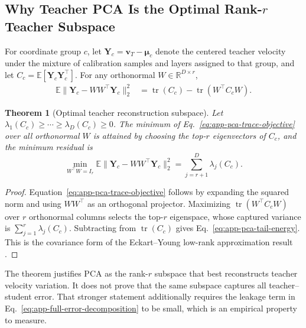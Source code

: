 \documentclass{article}
\newcommand{\E}{\mathbb{E}}
\newcommand{\R}{\mathbb{R}}
\newcommand{\bv}{\boldsymbol{v}}
\newcommand{\bmu}{\boldsymbol{\mu}}
\newcommand{\bI}{I}
\theoremstyle{plain}
\newtheorem{theorem}{Theorem}
\theoremstyle{definition}
\theoremstyle{remark}
\begin{document}
\subsection{Why Teacher PCA Is the Optimal
\texorpdfstring{Rank-$r$}{Rank-r} Teacher Subspace}
\label{app:pca-optimality}

For coordinate group $c$, let $\boldsymbol Y_c=\bv_T-\bmu_c$ denote the centered
teacher velocity under the mixture of calibration samples and layers assigned to
that group, and let
$C_c=\E[\boldsymbol Y_c\boldsymbol Y_c^\top]$.  For any orthonormal
$W\in\R^{D\times r}$,
\begin{equation}
\begin{aligned}
  \E\|\boldsymbol Y_c-WW^\top\boldsymbol Y_c\|_2^2
  &=\operatorname{tr}(C_c)-\operatorname{tr}(W^\top C_c W).
  \label{eq:app-pca-trace-objective}
\end{aligned}
\end{equation}

\begin{theorem}[Optimal teacher reconstruction subspace]
\label{thm:app-pca-optimal}
Let $\lambda_1(C_c)\ge\cdots\ge\lambda_D(C_c)\ge0$.  The minimum of
Eq.~\eqref{eq:app-pca-trace-objective} over all orthonormal $W$ is attained by
choosing the top-$r$ eigenvectors of $C_c$, and the minimum residual is
\begin{equation}
  \min_{W^\top W=\bI_r}
  \E\|\boldsymbol Y_c-WW^\top\boldsymbol Y_c\|_2^2
  =\sum_{j=r+1}^{D}\lambda_j(C_c).
  \label{eq:app-pca-tail-energy}
\end{equation}
\end{theorem}

\begin{proof}
Equation~\eqref{eq:app-pca-trace-objective} follows by expanding the squared norm
and using $WW^\top$ as an orthogonal projector.  Maximizing
$\operatorname{tr}(W^\top C_c W)$ over $r$ orthonormal columns selects the top-$r$
eigenspace, whose captured variance is $\sum_{j=1}^{r}\lambda_j(C_c)$.  Subtracting
from $\operatorname{tr}(C_c)$ gives Eq.~\eqref{eq:app-pca-tail-energy}.  This is
the covariance form of the Eckart--Young low-rank approximation result
\citep{eckart1936approximation}.
\end{proof}

The theorem justifies PCA as the rank-$r$ subspace that best reconstructs teacher
velocity variation.  It does not prove that the same subspace captures all
teacher--student error.  That stronger statement additionally requires the
leakage term in Eq.~\eqref{eq:app-full-error-decomposition} to be small, which is
an empirical property to measure.
\end{document}
